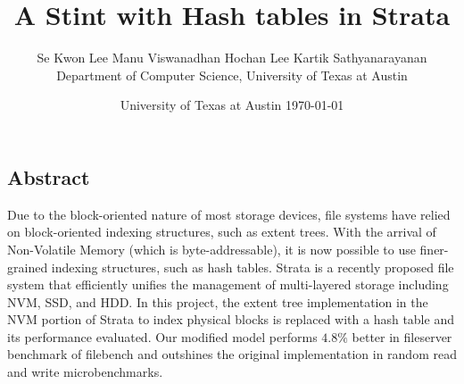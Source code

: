 \documentclass[letterpaper,twocolumn, 11pt]{article}
\begin{document}
\date{}

\title{\Large \bf A Stint with Hash tables in Strata}

\author{
{\rm Se Kwon Lee}
\qquad
{\rm Manu Viswanadhan}
\qquad
{\rm Hochan Lee}
\qquad
{\rm Kartik Sathyanarayanan}\\
Department of Computer Science, University of Texas at Austin
} %

\date{University of Texas at Austin \today}

\maketitle

\thispagestyle{empty}


\subsection*{Abstract}
Due to the block-oriented nature of most storage devices, file systems have relied on block-oriented indexing structures, such as extent trees. With the arrival of Non-Volatile Memory (which is byte-addressable), it is now possible to use finer-grained indexing structures, such as hash tables. Strata is a recently proposed file system that efficiently unifies the management of multi-layered storage including NVM, SSD, and HDD. In this project, the extent tree implementation in the NVM portion of Strata to index physical blocks is replaced with a hash table and its performance evaluated. Our modified model performs $4.8\%$ better in fileserver benchmark of filebench and outshines the original implementation in random read and write microbenchmarks.

\end{document}
